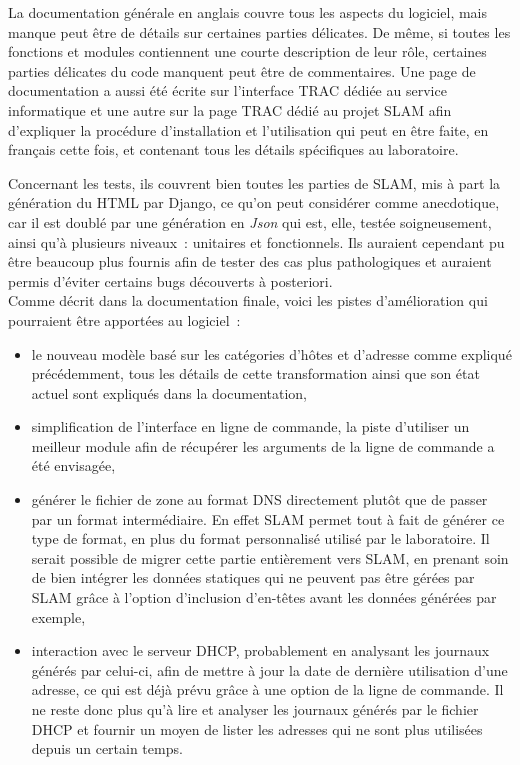 \documentclass[12pt,a4paper,twoside]{report}
\begin{document}
La documentation générale en anglais couvre tous les aspects du logiciel, mais
manque peut être de détails sur certaines parties délicates. De même, si toutes
les fonctions et modules contiennent une courte description de leur rôle,
certaines parties délicates du code manquent peut être de commentaires. Une
page de documentation a aussi été écrite sur l’interface TRAC dédiée au
service informatique et une autre sur la page TRAC dédié au projet SLAM afin
d’expliquer la procédure d’installation et l’utilisation qui peut en être
faite, en français cette fois, et contenant tous les détails spécifiques au
laboratoire.

Concernant les tests, ils couvrent bien toutes les parties de SLAM, mis à part
la génération du HTML par Django, ce qu’on peut considérer comme anecdotique,
car il est doublé par une génération en \emph{Json} qui est, elle, testée
soigneusement, ainsi qu’à plusieurs niveaux~: unitaires et fonctionnels. Ils
auraient cependant pu être beaucoup plus fournis afin de tester des cas plus
pathologiques et auraient permis d’éviter certains bugs découverts à
posteriori.\\

Comme décrit dans la documentation finale, voici les pistes
d’amélioration qui pourraient être apportées au logiciel~:

\begin{itemize}
	\item le nouveau modèle basé sur les catégories d’hôtes et d’adresse comme
	expliqué précédemment, tous les détails de cette transformation ainsi que
	son état actuel sont expliqués dans la documentation,
	\item simplification de l’interface en ligne de commande, la piste
	d’utiliser un meilleur module afin de récupérer les arguments de la ligne
	de commande a été envisagée,
	\item générer le fichier de zone au format DNS directement plutôt que de
	passer par un format intermédiaire. En effet SLAM permet tout à fait de
	générer ce type de format, en plus du format personnalisé utilisé par le
	laboratoire. Il serait possible de migrer cette partie entièrement vers
	SLAM, en prenant soin de bien intégrer les données statiques qui ne peuvent
	pas être gérées par SLAM grâce à l’option d’inclusion d’en-têtes avant les
	données générées par exemple,
	\item interaction avec le serveur DHCP, probablement en analysant les
	journaux générés par celui-ci, afin de mettre à jour la date de dernière
	utilisation d’une adresse, ce qui est déjà prévu grâce à une option de la
	ligne de commande. Il ne reste donc plus qu’à lire et analyser les journaux
	générés par le fichier DHCP et fournir un moyen de lister les adresses qui
	ne sont plus utilisées depuis un certain temps.
\end{itemize}
~\\
\end{document}
